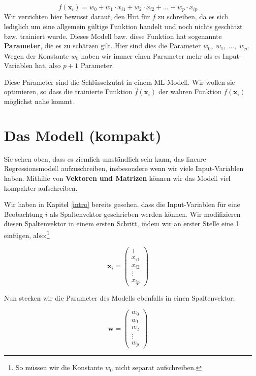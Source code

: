 \documentclass[
]{book}
\begin{document}
\[
f(\mathbf{x}_i) = w_0 + w_1 \cdot x_{i1} + w_2 \cdot x_{i2} + \ldots + w_p \cdot x_{ip}
\]
Wir verzichten hier bewusst darauf, den Hut für \(f\) zu schreiben, da es sich lediglich um eine allgemein gültige Funktion handelt und noch nichts geschätzt bzw. trainiert wurde. Dieses Modell bzw. diese Funktion hat sogenannte \textbf{Parameter}, die es zu schätzen gilt. Hier sind dies die Parameter \(w_0,\; w_1,\; \ldots,\; w_p\). Wegen der Konstante \(w_0\) haben wir immer einen Parameter mehr als es Input-Variablen hat, also \(p+1\) Parameter.

Diese Parameter sind die Schlüsselzutat in einem ML-Modell. Wir wollen sie optimieren, so dass die trainierte Funktion \(\hat{f}(\mathbf{x}_i)\) der wahren Funktion \(f(\mathbf{x}_i)\) möglichst nahe kommt.

\hypertarget{das-modell-kompakt}{%
\section{Das Modell (kompakt)}\label{das-modell-kompakt}}

Sie sehen oben, dass es ziemlich umständlich sein kann, das lineare Regressionsmodell aufzuschreiben, insbesondere wenn wir viele Input-Variablen haben. Mithilfe von \textbf{Vektoren und Matrizen} können wir das Modell viel kompakter aufschreiben.

Wir haben in Kapitel \ref{intro} bereits gesehen, dass die Input-Variablen für eine Beobachtung \(i\) als Spaltenvektor geschrieben werden können. Wir modifizieren diesen Spaltenvektor in einem ersten Schritt, indem wir an erster Stelle eine 1 einfügen, also:\footnote{So müssen wir die Konstante \(w_0\) nicht separat aufschreiben.}

\[\mathbf{x}_i=\begin{pmatrix} 1\\ x_{i1} \\ x_{i2} \\ \vdots \\ x_{ip} \end{pmatrix}\]

Nun stecken wir die Parameter des Modells ebenfalls in einen Spaltenvektor:

\[\mathbf{w}=\begin{pmatrix} w_0 \\ w_1 \\ w_2 \\ \vdots \\ w_p \end{pmatrix}\]
\end{document}
